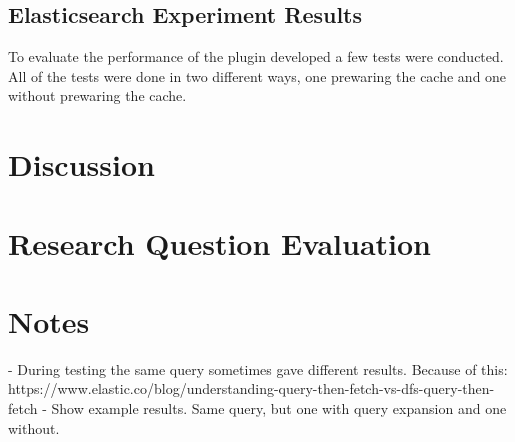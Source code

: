 \subsection{Elasticsearch Experiment Results}
To evaluate the performance of the plugin developed a few tests were conducted.
All of the tests were done in two different ways,
one prewaring the cache and one without prewaring the cache.

\section{Discussion}

\section{Research Question Evaluation}

\section{Notes}
- During testing the same query sometimes gave different results. Because of this: https://www.elastic.co/blog/understanding-query-then-fetch-vs-dfs-query-then-fetch
- Show example results. Same query, but one with query expansion and one without.
